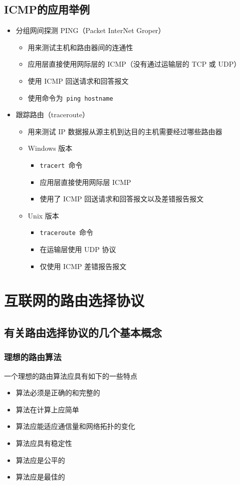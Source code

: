 \documentclass[cs4size,a4paper,10pt]{ctexart}
\begin{document}
	\subsection{ICMP的应用举例}
	\begin{itemize}
		\item 分组网间探测 PING（Packet InterNet Groper）
		\begin{itemize}
			\item 用来测试主机和路由器间的连通性
			\item 应用层直接使用网际层的 ICMP（没有通过运输层的 TCP 或 UDP）
			\item 使用 ICMP 回送请求和回答报文
			\item 使用命令为\ \verb|ping hostname|
		\end{itemize}
		\item 跟踪路由（traceroute）
		\begin{itemize}
			\item 用来测试 IP 数据报从源主机到达目的主机需要经过哪些路由器
			\item Windows 版本
			\begin{itemize}
				\item \verb|tracert|\ 命令
				\item 应用层直接使用网际层 ICMP
				\item 使用了 ICMP 回送请求和回答报文以及差错报告报文
			\end{itemize}
			\item Unix 版本
			\begin{itemize}
				\item \verb|traceroute|\ 命令
				\item 在运输层使用 UDP 协议
				\item 仅使用 ICMP 差错报告报文
			\end{itemize}
		\end{itemize}
	\end{itemize}

	\section{互联网的路由选择协议}

	\subsection{有关路由选择协议的几个基本概念}

	\subsubsection{理想的路由算法}
	一个理想的路由算法应具有如下的一些特点
	\begin{itemize}
		\item 算法必须是正确的和完整的
		\item 算法在计算上应简单
		\item 算法应能适应通信量和网络拓扑的变化
		\item 算法应具有稳定性
		\item 算法应是公平的
		\item 算法应是最佳的
	\end{itemize}
\end{document}
